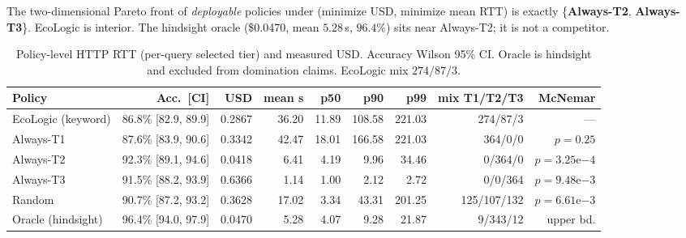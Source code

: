 \documentclass[10pt,conference]{IEEEtran}
\begin{document}
The two-dimensional Pareto front of \emph{deployable} policies under (minimize USD, minimize mean RTT) is exactly \{\textbf{Always-T2}, \textbf{Always-T3}\}. EcoLogic is interior. The hindsight oracle (\$0.0470, mean $5.28$\,s, $96.4\%$) sits near Always-T2; it is not a competitor.

\begin{table}[t]
\centering
\caption{Policy-level HTTP RTT (per-query selected tier) and measured USD. Accuracy Wilson 95\% CI. Oracle is hindsight and excluded from domination claims. EcoLogic mix $274/87/3$.}
\label{tab:policies}
\setlength{\tabcolsep}{3.4pt}
\begin{tabular}{@{}lrrrrrrrr@{}}
\toprule
Policy & Acc.\ [CI] & USD & mean s & p50 & p90 & p99 & mix T1/T2/T3 & McNemar \\
\midrule
EcoLogic (keyword) & 86.8\% [82.9, 89.9] & 0.2867 & 36.20 & 11.89 & 108.58 & 221.03 & 274/87/3 & --- \\
Always-T1 & 87.6\% [83.9, 90.6] & 0.3342 & 42.47 & 18.01 & 166.58 & 221.03 & 364/0/0 & $p{=}0.25$ \\
Always-T2 & 92.3\% [89.1, 94.6] & 0.0418 & 6.41 & 4.19 & 9.96 & 34.46 & 0/364/0 & $p{=}3.25\mathrm{e}{-4}$ \\
Always-T3 & 91.5\% [88.2, 93.9] & 0.6366 & 1.14 & 1.00 & 2.12 & 2.72 & 0/0/364 & $p{=}9.48\mathrm{e}{-3}$ \\
Random & 90.7\% [87.2, 93.2] & 0.3628 & 17.02 & 3.34 & 43.31 & 201.25 & 125/107/132 & $p{=}6.61\mathrm{e}{-3}$ \\
Oracle (hindsight) & 96.4\% [94.0, 97.9] & 0.0470 & 5.28 & 4.07 & 9.28 & 21.87 & 9/343/12 & upper bd. \\
\bottomrule
\end{tabular}
\end{table}
\end{document}
